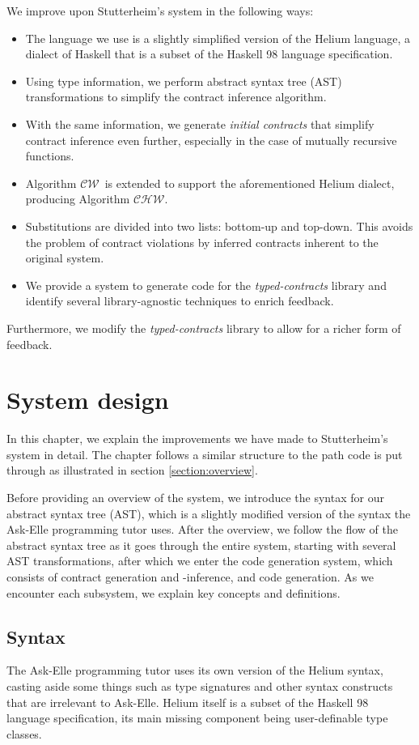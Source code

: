 \documentclass[10pt]{report}
\newcommand{\CW}{$\mathcal{CW}$}
\newcommand{\CHW}{$\mathcal{CHW}$}
\begin{document}
We improve upon Stutterheim's system in the following ways:
\begin{itemize}
	\item The language we use is a slightly simplified version of the Helium language, a dialect of Haskell that is a subset of the Haskell 98 language specification.
	\item Using type information, we perform abstract syntax tree (AST) transformations to simplify the contract inference algorithm.
	\item With the same information, we generate \textit{initial contracts} that simplify contract inference even further, especially in the case of mutually recursive functions.
	\item Algorithm \CW ~is extended to support the aforementioned Helium dialect, producing Algorithm \CHW.
	\item Substitutions are divided into two lists: bottom-up and top-down. This avoids the problem of contract violations by inferred contracts inherent to the original system.
	\item We provide a system to generate code for the \textit{typed-contracts} library and identify several library-agnostic techniques to enrich feedback.
\end{itemize}

Furthermore, we modify the \textit{typed-contracts} library to allow for a richer form of feedback.

\chapter{System design}
\label{chapter-system-design}

In this chapter, we explain the improvements we have made to Stutterheim's system in detail.
The chapter follows a similar structure to the path code is put through as illustrated in section \ref{section:overview}.

Before providing an overview of the system, we introduce the syntax for our abstract syntax tree (AST), which is a slightly modified version of the syntax the Ask-Elle programming tutor uses.
After the overview, we follow the flow of the abstract syntax tree as it goes through the entire system, starting with several AST transformations, after which we enter the code generation system, which consists of contract generation and -inference, and code generation.
As we encounter each subsystem, we explain key concepts and definitions.

\section{Syntax}
The Ask-Elle programming tutor uses its own version of the Helium syntax, casting aside some things such as type signatures and other syntax constructs that are irrelevant to Ask-Elle.
Helium itself is a subset of the Haskell 98 language specification, its main missing component being user-definable type classes.
\end{document}
